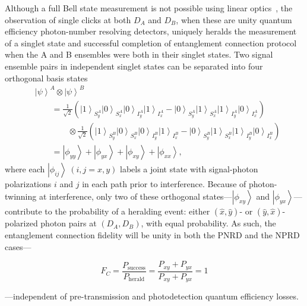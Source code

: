 \documentclass[aps,twocolumn,secnumarabic,amsmath,amssymb,pra,groupedaddress,
showpacs, showkeys]{revtex4-1}
\newcommand{\ket}[1]{\left|#1\right\rangle}
\newcommand{\pna}[1]{\left(#1\right)}
\newcommand{\eqn}[1]{
\begin{equation}
	#1
\end{equation}
}
\begin{document}
Although a full Bell state measurement is not possible using linear
optics~\cite{PhysRevA.59.3295}, the observation of single clicks at both $D_A$
and $D_B$, when these are unity quantum efficiency photon-number resolving
detectors, uniquely heralds the measurement of a singlet state and successful
completion of entanglement connection protocol when the A and B ensembles were
both in their singlet states. Two signal ensemble pairs in independent singlet
states can be separated into four orthogonal basis states
\begin{align}
& \ket{\psi}^A \otimes \ket{\psi}^B \nonumber \\ 
& \qquad =
\frac{1}{\sqrt{2}}\pna{\ket{1}_{S_y^A}\ket{0}_{S_x^A}\ket{0}_{I_y^A}\ket{1}_{I_x^A}-\ket{0}_{S_y^A}\ket{1}_{S_x^A}\ket{1}_{I_y^A}\ket{0}_{I_x^A}}\nonumber
\\ 
& \qquad \qquad \otimes \frac{1}{\sqrt{2}}\pna{\ket{1}_{S_y^B}\ket{0}_{S_x^B}\ket{0}_{I_y^B}\ket{1}_{I_x^B}-\ket{0}_{S_y^B}\ket{1}_{S_x^B}\ket{1}_{I_y^B}\ket{0}_{I_x^B}} \nonumber \\
& \qquad = \ket{\phi_{yy}}+\ket{\phi_{yx}}+\ket{\phi_{xy}}+\ket{\phi_{xx}},
\end{align}
where each $\ket{\phi_{ij}}~\pna{i,j=x,y}$ labels a joint state with
signal-photon polarizations $i$ and $j$ in each path prior to interference.
Because of photon-twinning at interference, only two of these orthogonal
states---$\ket{\phi_{xy}}$ and $\ket{\phi_{yx}}$---contribute to the
probability of a heralding event: either $\pna{\hat{x},\hat{y}}$- or
$\pna{\hat{y},\hat{x}}$-polarized photon pairs at $\pna{D_A,D_B}$, with equal
probability.  As such, the entanglement connection fidelity will be unity in
both the PNRD and the NPRD cases---
\eqn{
F_C = \frac{P_{\textrm{success}}}{P_{\textrm{herald}}} = \frac{P_{xy}+P_{yx}}{P_{xy}+P_{yx}}=1
}
---independent of pre-transmission and photodetection quantum efficiency losses. 
\end{document}
